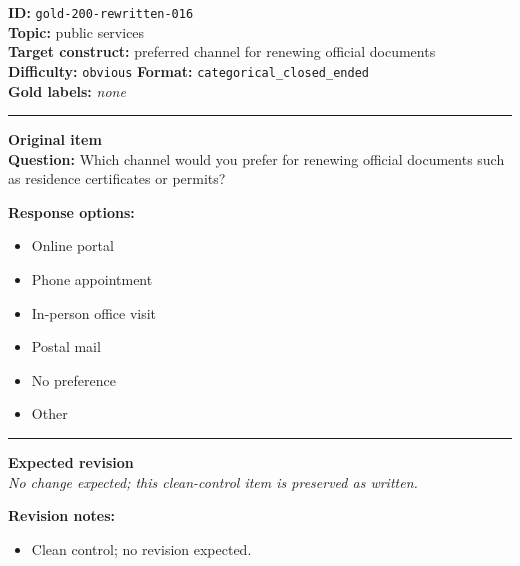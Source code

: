 \documentclass[10pt,a4paper]{article}
\newcommand{\sectionline}{\vspace{0.15em}\hrule\vspace{0.35em}}
\begin{document}
\begin{tcolorbox}[colframe=CleanGreen,colback=white,colbacktitle=CleanGreen!9,coltitle=black,title={Item 016\hfill Clean control}]
\textbf{ID:} \texttt{gold-200-rewritten-016}\\
\textbf{Topic:} public services\\
\textbf{Target construct:} preferred channel for renewing official documents\\
\textbf{Difficulty:} \texttt{obvious} \quad \textbf{Format:} \texttt{categorical\_closed\_ended}\\
\textbf{Gold labels:} \textit{none}\\
\sectionline
\textbf{Original item}\\
\textbf{Question:} Which channel would you prefer for renewing official documents such as residence certificates or permits?
\par\textbf{Response options:}
\begin{itemize}
\item Online portal
\item Phone appointment
\item In-person office visit
\item Postal mail
\item No preference
\item Other
\end{itemize}
\sectionline
\textbf{Expected revision}\\
\textit{No change expected; this clean-control item is preserved as written.}
\par\textbf{Revision notes:}
\begin{itemize}
\item Clean control; no revision expected.
\end{itemize}
\end{tcolorbox}
\end{document}
